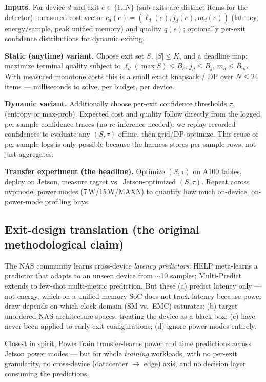 \documentclass[11pt]{article}
\begin{document}
\textbf{Inputs.} For device $d$ and exit $e \in \{1..N\}$ (sub-exits are
distinct items for the detector): measured cost vector
$c_d(e) = (\ell_d(e), j_d(e), m_d(e))$ (latency, energy/sample, peak unified
memory) and quality $q(e)$; optionally per-exit confidence distributions for
dynamic exiting.

\textbf{Static (anytime) variant.} Choose exit set $S$, $|S| \le K$, and a
deadline map; maximize terminal quality subject to
$\ell_d(\max S) \le B_\ell$, $j_d \le B_j$, $m_d \le B_m$. With measured
monotone costs this is a small exact knapsack / DP over $N \le 24$ items ---
milliseconds to solve, per budget, per device.

\textbf{Dynamic variant.} Additionally choose per-exit confidence thresholds
$\tau_e$ (entropy or max-prob). Expected cost and quality follow directly from
the logged per-sample confidence traces (no re-inference needed): we replay
recorded confidences to evaluate any $(S, \tau)$ offline, then grid/DP-optimize.
This reuse of per-sample logs is only possible because the harness stores
per-sample rows, not just aggregates.

\textbf{Transfer experiment (the headline).} Optimize $(S,\tau)$ on A100
tables, deploy on Jetson, measure regret vs.\ Jetson-optimized $(S,\tau)$.
Repeat across nvpmodel power modes (7\,W/15\,W/MAXN) to quantify how much
on-device, on-power-mode profiling buys.

\subsection{Exit-design translation (the original methodological claim)}

The NAS community learns cross-device \emph{latency predictors}: HELP
\citep{help2021} meta-learns a predictor that adapts to an unseen device from
$\sim$10 samples; Multi-Predict \citep{multipredict2023} extends to few-shot
multi-metric prediction. But these (a) predict latency only --- not energy,
which on a unified-memory SoC does not track latency because power draw
depends on which clock domain (SM vs.\ EMC) saturates; (b) target unordered
NAS architecture spaces, treating the device as a black box; (c) have never
been applied to early-exit configurations; (d) ignore power modes entirely.

Closest in spirit, PowerTrain \citep{powertrain2024} transfer-learns power and
time predictions across Jetson power modes --- but for whole \emph{training}
workloads, with no per-exit granularity, no cross-device (datacenter
$\to$ edge) axis, and no decision layer consuming the predictions.
\end{document}
